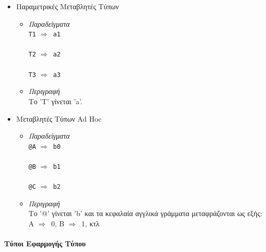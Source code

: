 \documentclass[diploma]{softlab-thesis}
\def\lra{$\Longrightarrow$\ }
\begin{document}
\begin{itemize}

\item
Παραμετρικές Μεταβλητές Τύπων

\begin{itemize}

\item
\textit{Παραδείγματα}\\

\verb|T1| \lra \verb|a1|\\\\
\verb|T2| \lra \verb|a2|\\\\
\verb|T3| \lra \verb|a3|\\

\item
\textit{Περιγραφή}\\

Το 'T' γίνεται 'a'.
\end{itemize}

\item
Μεταβλητές Τύπων Ad Hoc

\begin{itemize}
\item
\textit{Παραδείγματα}\\

\verb|@A| \lra \verb|b0|\\\\
\verb|@B| \lra \verb|b1|\\\\
\verb|@C| \lra \verb|b2|\\
\item
\textit{Περιγραφή}\\

Το '@' γίνεται 'b' και τα κεφαλαία αγγλικά γράμματα μεταφράζονται ως εξής:\\
A \lra 0, B \lra 1, κτλ
\end{itemize}

\end{itemize}

\newpage
\paragraph{Τύποι Εφαρμογής Τύπου}
\end{document}
